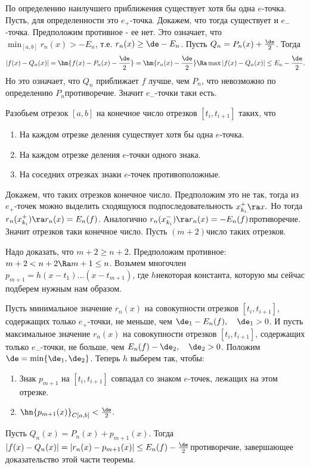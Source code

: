 \documentclass[a4paper]{article}
\begin{document}
По определению наилучшего приближения существует хотя бы одна
$e$-точка. Пусть, для определенности это $e_+$-точка. Докажем, что
тогда существует и $e_-$-точка. Предположим противное - ее нет.
Это означает, что $\min_{[a,b]}r_n(x)>-E_n$, т.е. $r_n(x)\ge
\de-E_n$. Пусть $Q_n=P_n(x)+\frac{\de}2$. Тогда
$$|f(x)-Q_n(x)|=\hm{f(x)-P_n(x)-\frac{\de}2}=\hm{r_n(x)-\frac{\de}2}\Ra
\max|f(x)-Q_n(x)|\le E_n-\frac{\de}2.$$ Но это означает, что
$Q_n$ приближает $f$ лучше, чем $P_n$, что невозможно по
определению $P_n$\т противоречие. Значит $e_-$-точки таки есть.

Разобьем отрезок $[a,b]$ на конечное число отрезков
$[t_i,t_{i+1}]$ таких, что
\begin{enumerate}
\item
На каждом отрезке деления существует хотя бы одна $e$-точка.
\item
На каждом отрезке деления $e$-точки одного знака.
\item
На соседних отрезках знаки $e$-точек противоположные.
\end{enumerate}

Докажем, что таких отрезков конечное число. Предположим это не
так, тогда из $e_+$-точек можно выделить сходящуюся
подпоследовательность $x_{k_i}^+\ra x.$ Но тогда
$r_n(x_{k_i}^+)\ra r_n(x)=E_n(f)$. Аналогично
$r_n(x_{k_i}^-)\ra r_n(x)=-E_n(f)$\т противоречие. Значит
отрезков таки конечное число. Пусть $(m+2)$\т число таких
отрезков.

Надо доказать, что $m+2\ge n+2$. Предположим противное:
$m+2<n+2\Ra m+1\le n$. Возьмем многочлен
$p_{m+1}=h(x-t_1)\dots(x-t_{m+1})$, где $h$\т некоторая константа,
которую мы сейчас подберем нужным нам образом.

Пусть минимальное значение $r_n(x)$ на совокупности отрезков
$[t_i,t_{i+1}]$, содержащих только $e_+$-точки, не меньше, чем
$\de_1-E_n(f),\quad\de_1>0$. И пусть максимальное значение
$r_n(x)$ на совокупности отрезков $[t_i,t_{i+1}]$, содержащих
только $e_-$-точки, не больше, чем
$E_n(f)-\de_2,\quad\de_2>0$. Положим
$\de=\min\{\de_1,\de_2\}$. Теперь $h$ выберем так, чтобы:
\begin{enumerate}
\item
Знак $p_{m+1}$ на $[t_i,t_{i+1}]$ совпадал со знаком $e$-точек,
лежащих на этом отрезке.
\item
$\hn{p_{m+1}(x)}_{C[a,b]}<\frac{\de}2.$
\end{enumerate}

Пусть $Q_n(x)=P_n(x)+p_{m+1}(x)$. Тогда
$|f(x)-Q_n(x)|=|r_n(x)-p_{m+1}(x)|\le E_n(f)-\frac{\de}2$\т противоречие, завершающее доказательство этой части теоремы.
\end{document}
